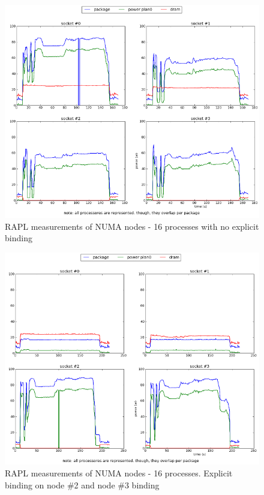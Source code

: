 


\begin{figure}[h!]
  \centering
    \includegraphics[width=150mm]{"img/numa/16proc_no_binding"}
    \caption{RAPL measurements of NUMA nodes - 16 processes with no explicit
    \label{fig:nf_ss}
binding}
\end{figure}

\begin{figure}[h!]
  \centering
    \includegraphics[width=150mm]{"img/numa/16proc_node2and3"}
    \caption{RAPL measurements of NUMA nodes - 16 processes. Explicit binding
    \label{fig:nf_ss}
on node \#2 and node \#3 binding}
\end{figure}

